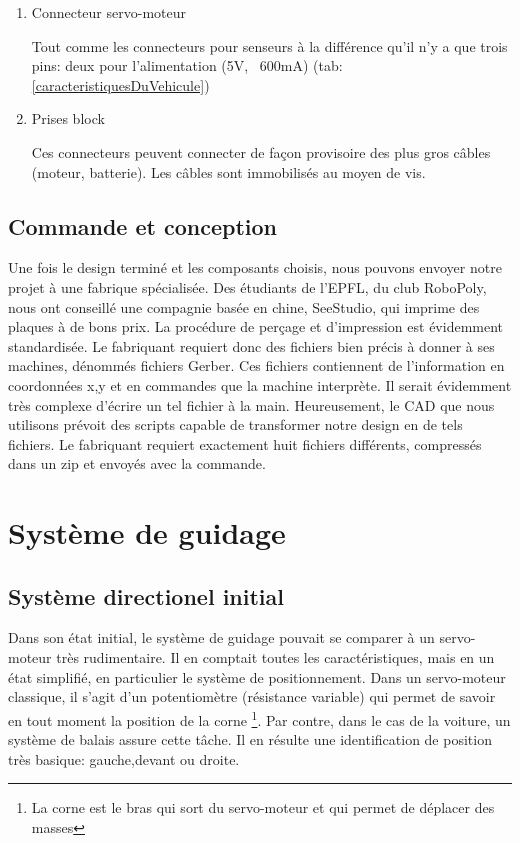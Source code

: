 \documentclass[a4paper,11pt]{report}
\begin{document}
{\begin{enumerate}
\begin{enumerate}
\begin{enumerate}
\item Connecteur servo-moteur

Tout comme les connecteurs pour senseurs à la différence qu'il n'y a que trois pins: deux pour l'alimentation (5V, ~600mA) (tab:
\ref{caracteristiquesDuVehicule})


\item Prises block

Ces connecteurs peuvent connecter de façon provisoire des plus gros câbles (moteur, batterie). Les câbles sont immobilisés au moyen de vis.

\end{enumerate}

\subsection{Commande et conception}
Une fois le design terminé et les composants choisis, nous pouvons envoyer
notre projet à une fabrique spécialisée. Des étudiants de l'EPFL, du club
RoboPoly, nous ont conseillé une compagnie basée en chine, SeeStudio, qui imprime des
plaques à de bons prix. La procédure de perçage et d'impression est évidemment
standardisée. Le fabriquant requiert donc des fichiers bien précis à donner à
ses machines, dénommés fichiers Gerber. Ces fichiers contiennent de
l'information en coordonnées x,y et en commandes que la machine interprète. Il
serait évidemment très complexe d'écrire un tel fichier à la
main. Heureusement, le CAD que nous utilisons prévoit des scripts capable de
transformer notre design en de tels fichiers. Le fabriquant requiert
exactement huit fichiers différents, compressés dans un zip et envoyés avec la commande.  


\section{Système de guidage}


\subsection{Système directionel initial}
Dans son état initial, le système de guidage pouvait se comparer à un
servo-moteur très rudimentaire. Il en comptait toutes les caractéristiques, mais en
un état simplifié, en particulier le système de positionnement. Dans un servo-moteur
classique, il s'agit d'un potentiomètre (résistance variable) qui permet
de savoir en tout moment la position de la corne \footnote{La corne est le bras qui sort du servo-moteur et qui permet de déplacer des masses}. Par contre, dans le cas de
la voiture, un système de balais assure cette tâche. Il en
résulte une identification de position très basique: gauche,devant ou
droite.


\end{enumerate}
\end{enumerate}}
\end{document}
